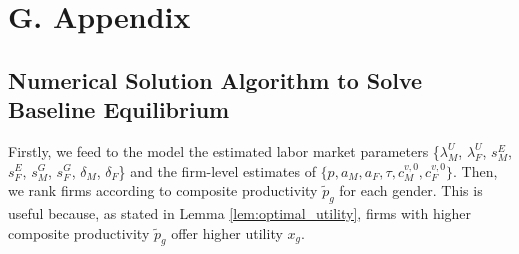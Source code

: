 

\clearpage
\section{G. {\sectioneight} Appendix\label{app:simulation}}
\renewcommand*{\thepage}{\Alph{section}\arabic{page}}
\setcounter{page}{1}


\subsection{Numerical Solution Algorithm to Solve Baseline Equilibrium\label{app:solution_algorithm}}

Firstly, we feed to the model the estimated labor market parameters \{$\lambda_{M}^{U}$, $\lambda_{F}^{U}$, $s_{M}^{E}$, $s_{F}^{E}$, $s_{M}^{G}$, $s_{F}^{G}$, $\delta_{M}$, $\delta_{F}$\} and the firm-level estimates of $\{ p, a_{M}, a_{F}, \tau, c_{M}^{v,0}, c_{F}^{v,0} \}$. Then, we rank firms according to composite productivity $\tilde{p}_{g}$ for each gender. This is useful because, as stated in Lemma \ref{lem:optimal_utility}, firms with higher composite productivity $\tilde{p}_{g}$ offer higher utility $x_{g}$.

